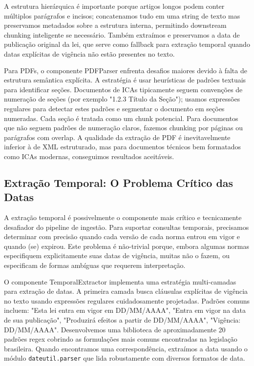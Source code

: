 \documentclass[12pt,a4paper]{article}
\begin{document}
A estrutura hierárquica é importante porque artigos longos podem conter múltiplos parágrafos e incisos; concatenamos tudo em uma string de texto mas preservamos metadados sobre a estrutura interna, permitindo downstream chunking inteligente se necessário. Também extraímos e preservamos a data de publicação original da lei, que serve como fallback para extração temporal quando datas explícitas de vigência não estão presentes no texto.

Para PDFs, o componente PDFParser enfrenta desafios maiores devido à falta de estrutura semântica explícita. A estratégia é usar heurísticas de padrões textuais para identificar seções. Documentos de ICAs tipicamente seguem convenções de numeração de seções (por exemplo "1.2.3 Título da Seção"); usamos expressões regulares para detectar estes padrões e segmentar o documento em seções numeradas. Cada seção é tratada como um chunk potencial. Para documentos que não seguem padrões de numeração claros, fazemos chunking por páginas ou parágrafos com overlap. A qualidade da extração de PDF é inevitavelmente inferior à de XML estruturado, mas para documentos técnicos bem formatados como ICAs modernas, conseguimos resultados aceitáveis.

\subsection{Extração Temporal: O Problema Crítico das Datas}

A extração temporal é possivelmente o componente mais crítico e tecnicamente desafiador do pipeline de ingestão. Para suportar consultas temporais, precisamos determinar com precisão quando cada versão de cada norma entrou em vigor e quando (se) expirou. Este problema é não-trivial porque, embora algumas normas especifiquem explicitamente suas datas de vigência, muitas não o fazem, ou especificam de formas ambíguas que requerem interpretação.

O componente TemporalExtractor implementa uma estratégia multi-camadas para extração de datas. A primeira camada busca cláusulas explícitas de vigência no texto usando expressões regulares cuidadosamente projetadas. Padrões comuns incluem: "Esta lei entra em vigor em DD/MM/AAAA", "Entra em vigor na data de sua publicação", "Produzirá efeitos a partir de DD/MM/AAAA", "Vigência: DD/MM/AAAA". Desenvolvemos uma biblioteca de aproximadamente 20 padrões regex cobrindo as formulações mais comuns encontradas na legislação brasileira. Quando encontramos uma correspondência, extraímos a data usando o módulo \texttt{dateutil.parser} que lida robustamente com diversos formatos de data.
\end{document}
